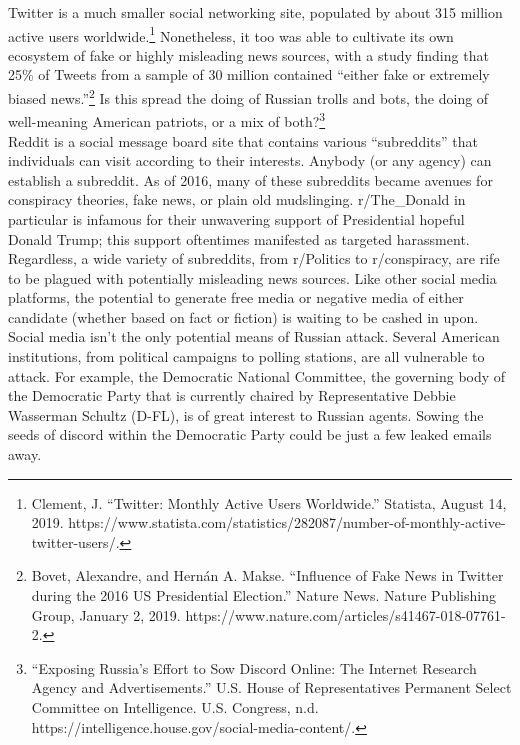 \documentclass[10pt, letterpaper]{article}
\begin{document}
Twitter is a much smaller social networking site, populated by about 315
million active users worldwide.\footnote{Clement, J. ``Twitter: Monthly
  Active Users Worldwide.'' Statista, August 14, 2019.
  https://www.statista.com/statistics/282087/number-of-monthly-active-twitter-users/.}
Nonetheless, it too was able to cultivate its own ecosystem of fake or
highly misleading news sources, with a study finding that 25\% of Tweets
from a sample of 30 million contained ``either fake or extremely biased
news.''\footnote{Bovet, Alexandre, and Hernán A. Makse. ``Influence of
  Fake News in Twitter during the 2016 US Presidential Election.''
  Nature News. Nature Publishing Group, January 2, 2019.
  https://www.nature.com/articles/s41467-018-07761-2.} Is this spread
the doing of Russian trolls and bots, the doing of well-meaning American
patriots, or a mix of both?\footnote{``Exposing Russia's Effort to Sow
  Discord Online: The Internet Research Agency and Advertisements.''
  U.S. House of Representatives Permanent Select Committee on
  Intelligence. U.S. Congress, n.d.
  https://intelligence.house.gov/social-media-content/.} \\

Reddit is a social message board site that contains various
``subreddits'' that individuals can visit according to their interests.
Anybody (or any agency) can establish a subreddit. As of 2016, many of
these subreddits became avenues for conspiracy theories, fake news, or
plain old mudslinging. r/The\_Donald in particular is infamous for their
unwavering support of Presidential hopeful Donald Trump; this support
oftentimes manifested as targeted harassment. Regardless, a wide variety
of subreddits, from r/Politics to r/conspiracy, are rife to be plagued
with potentially misleading news sources. Like other social media
platforms, the potential to generate free media or negative media of
either candidate (whether based on fact or fiction) is waiting to be
cashed in upon. \\

Social media isn't the only potential means of Russian attack. Several
American institutions, from political campaigns to polling stations, are
all vulnerable to attack. For example, the Democratic National
Committee, the governing body of the Democratic Party that is currently
chaired by Representative Debbie Wasserman Schultz (D-FL), is of great
interest to Russian agents. Sowing the seeds of discord within the
Democratic Party could be just a few leaked emails away. \\
\end{document}
